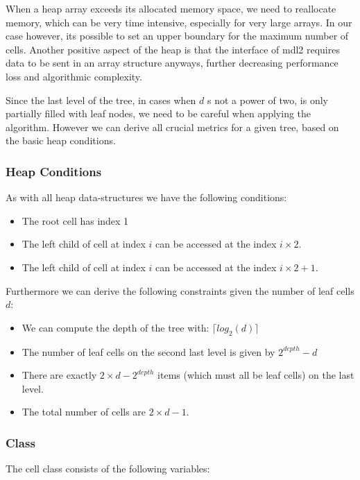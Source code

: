 \documentclass[]{article}
\begin{document}
When a heap array exceeds its allocated memory space, we need to reallocate memory, which can be very time intensive, especially for very large arrays. In our case however, its possible to set an upper boundary for the maximum number of cells. Another positive aspect of the heap is that the interface of mdl2 requires data to be sent in an array structure anyways, further decreasing performance loss and algorithmic complexity.


Since the last level of the tree, in cases when $d$ s not a power of two, is only partially filled with leaf nodes, we need to be careful when applying the algorithm. However we can derive all crucial metrics for a given tree, based on the basic heap conditions.

\subsubsection{Heap Conditions}
As with all heap data-structures we have the following conditions:

\begin{itemize}
	\item The root cell has index 1
	\item The left child of cell at index $i$ can be accessed at the index $i\times2$. 
	\item The left child of cell at index $i$ can be accessed at the index $i\times2 + 1$. 
\end{itemize}

\vspace{0.5cm}
Furthermore we can derive the following constraints given the number of leaf cells $d$:

\begin{itemize}
	\item We can compute the depth of the tree with: $\lceil log_2(d) \rceil$
	\item The number of leaf cells on the second last level is given by $2^{depth} - d$ 
	\item There are exactly $2 \times d - 2^{depth}$ items (which must all be leaf cells) on the last level. 
	\item The total number of cells are $2\times d - 1$.
\end{itemize}

\subsubsection{Class}
The cell class consists of the following variables:
\end{document}
